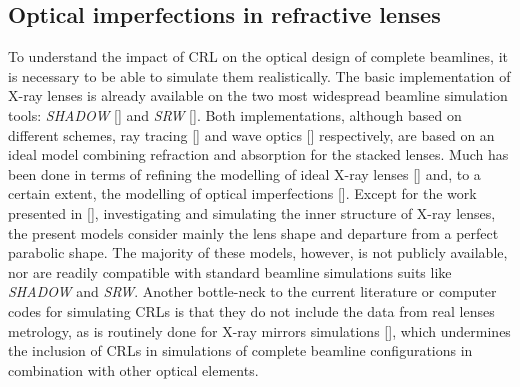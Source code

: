 \begin{refsection}
\chapter{Optical imperfections in refractive lenses}\label{sec:optical_imperfections}

To understand the impact of CRL on the optical design of complete beamlines, it is necessary to be able to simulate them realistically. The basic implementation of X-ray lenses is already available on the two most widespread beamline simulation tools: \textit{SHADOW} [\cite{SanchezdelRio2011}] and \textit{SRW} [\cite{Chubar1998}]. Both implementations, although based on different schemes, ray tracing [\cite{Alianelli2007}] and wave optics [\cite{Baltser2011}] respectively, are based on an ideal model combining refraction and absorption for the stacked lenses. Much has been done in terms of refining the modelling of ideal X-ray lenses [\cite{Umbach2008, SanchezdelRio2012, Osterhoff2013, Simons2017, Pedersen2018}] and, to a certain extent, the modelling of optical imperfections [\cite{Pantell2001, Andrejczuk2010, Gasilov2017, Osterhoff2017}]. Except for the work presented in [\cite{Roth2014}], investigating and simulating the inner structure of X-ray lenses, the present models consider mainly the lens shape and departure from a perfect parabolic shape. The majority of these models, however, is not publicly available, nor are readily compatible with standard beamline simulations suits like \textit{SHADOW} and \textit{SRW}. Another bottle-neck to the current literature or computer codes for simulating CRLs is that they do not include the data from real lenses metrology, as is routinely done for X-ray mirrors simulations [\cite{SanchezDelRio2016}], which undermines the inclusion of CRLs in simulations of complete beamline configurations in combination with other optical elements.


\end{refsection}
